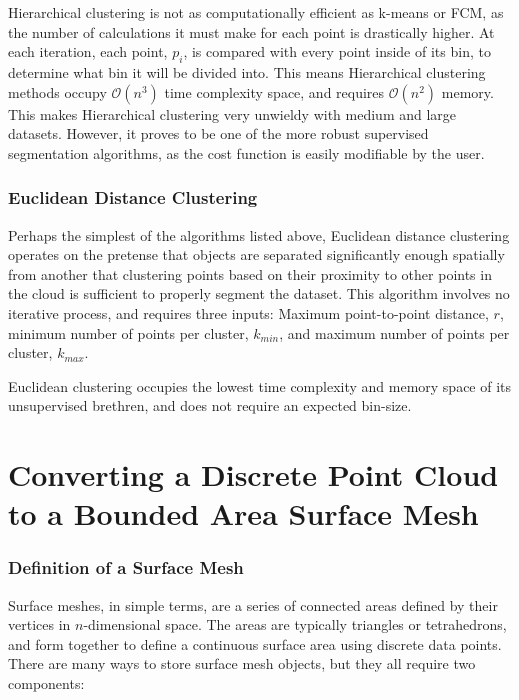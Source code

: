 \documentclass[12pt]{drexelthesis}
\let\Oldsection\section
\renewcommand{\section}{\FloatBarrier\Oldsection}
\let\Oldsubsubsection\subsubsection
\renewcommand{\subsubsection}{\FloatBarrier\Oldsubsubsection}
\begin{document}
Hierarchical clustering is not as computationally efficient as k-means or FCM, as the number of calculations it must make for each point is drastically higher. At each iteration, each point, $p_{i}$, is compared with every point inside of its bin, to determine what bin it will be divided into. This means Hierarchical clustering methods occupy $\mathcal{O}(n^{3})$ time complexity space, and requires $\mathcal{O}(n^{2})$ memory. This makes Hierarchical clustering very unwieldy with medium and large datasets. However, it proves to be one of the more robust supervised segmentation algorithms, as the cost function is easily modifiable by the user.


\subsubsection{Euclidean Distance Clustering}
Perhaps the simplest of the algorithms listed above, Euclidean distance clustering operates on the pretense that objects are separated significantly enough spatially from another that clustering points based on their proximity to other points in the cloud is sufficient to properly segment the dataset. This algorithm involves no iterative process, and requires three inputs: Maximum point-to-point distance, $r$, minimum number of points per cluster, $k_{min}$, and maximum number of points per cluster, $k_{max}$.

Euclidean clustering occupies the lowest time complexity and memory space of its unsupervised brethren, and does not require an expected bin-size.








\section{Converting a Discrete Point Cloud to a Bounded Area Surface Mesh}
\label{subsec:meshing}
\subsubsection{Definition of a Surface Mesh}
\label{subsubsec:surfdef}
Surface meshes, in simple terms, are a series of connected areas defined by their vertices in $n$-dimensional space. The areas are typically triangles or tetrahedrons, and form together to define a continuous surface area using discrete data points. There are many ways to store surface mesh objects, but they all require two components:
\end{document}
